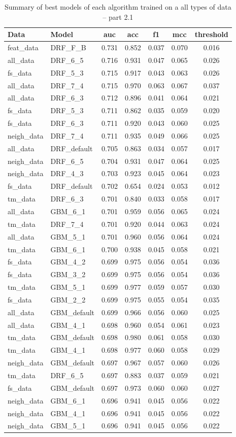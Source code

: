 \documentclass[thesis=M,english]{FITthesis}[2012/10/20]
\begin{document}
\begin{table}[H]\centering
\begin{small}
    \caption{Summary of best models of each algorithm trained on a all types of data -- part 2.1}\label{tab:all_data_summary_2_1}
    \begin{tabular}{|l|l|c|c|c|c|c|}\hline
Data & Model & \gls{auc} & \gls{acc} & \gls{f1} & \gls{mcc} & threshold \tabularnewline \hline \hline
feat\_data & DRF\_F\_B & 0.731 & 0.852 & 0.037 & 0.070 & 0.016 \tabularnewline  \hline 
all\_data & DRF\_6\_5 & 0.716 & 0.931 & 0.047 & 0.065 & 0.026 \tabularnewline  \hline 
fs\_data & DRF\_5\_3 & 0.715 & 0.917 & 0.043 & 0.063 & 0.026 \tabularnewline  \hline 
all\_data & DRF\_7\_4 & 0.715 & 0.970 & 0.063 & 0.067 & 0.037 \tabularnewline  \hline 
all\_data & DRF\_6\_3 & 0.712 & 0.896 & 0.041 & 0.064 & 0.021 \tabularnewline  \hline 
fs\_data & DRF\_5\_3 & 0.711 & 0.862 & 0.035 & 0.059 & 0.020 \tabularnewline  \hline 
fs\_data & DRF\_6\_3 & 0.711 & 0.920 & 0.043 & 0.060 & 0.025 \tabularnewline  \hline 
neigh\_data & DRF\_7\_4 & 0.711 & 0.935 & 0.049 & 0.066 & 0.025 \tabularnewline  \hline 
all\_data & DRF\_default & 0.705 & 0.863 & 0.034 & 0.057 & 0.017 \tabularnewline  \hline 
neigh\_data & DRF\_6\_5 & 0.704 & 0.931 & 0.047 & 0.064 & 0.025 \tabularnewline  \hline 
neigh\_data & DRF\_4\_3 & 0.703 & 0.923 & 0.045 & 0.064 & 0.023 \tabularnewline  \hline 
fs\_data & DRF\_default & 0.702 & 0.654 & 0.024 & 0.053 & 0.012 \tabularnewline  \hline 
tm\_data & DRF\_6\_3 & 0.701 & 0.840 & 0.033 & 0.058 & 0.017 \tabularnewline  \hline 
all\_data & GBM\_6\_1 & 0.701 & 0.959 & 0.056 & 0.065 & 0.024 \tabularnewline  \hline 
tm\_data & DRF\_7\_4 & 0.701 & 0.920 & 0.044 & 0.063 & 0.024 \tabularnewline  \hline 
all\_data & GBM\_5\_1 & 0.701 & 0.960 & 0.056 & 0.064 & 0.024 \tabularnewline  \hline 
tm\_data & GBM\_6\_1 & 0.700 & 0.938 & 0.045 & 0.058 & 0.021 \tabularnewline  \hline 
fs\_data & GBM\_4\_2 & 0.699 & 0.975 & 0.056 & 0.054 & 0.036 \tabularnewline  \hline 
fs\_data & GBM\_3\_2 & 0.699 & 0.975 & 0.056 & 0.054 & 0.036 \tabularnewline  \hline 
tm\_data & GBM\_5\_1 & 0.699 & 0.977 & 0.059 & 0.057 & 0.030 \tabularnewline  \hline 
fs\_data & GBM\_2\_2 & 0.699 & 0.975 & 0.055 & 0.054 & 0.035 \tabularnewline  \hline 
all\_data & GBM\_default & 0.699 & 0.966 & 0.056 & 0.060 & 0.025 \tabularnewline  \hline 
all\_data & GBM\_4\_1 & 0.698 & 0.960 & 0.054 & 0.061 & 0.023 \tabularnewline  \hline 
tm\_data & GBM\_default & 0.698 & 0.980 & 0.061 & 0.058 & 0.030 \tabularnewline  \hline 
tm\_data & GBM\_4\_1 & 0.698 & 0.977 & 0.060 & 0.058 & 0.029 \tabularnewline  \hline 
neigh\_data & GBM\_default & 0.697 & 0.967 & 0.057 & 0.060 & 0.026 \tabularnewline  \hline 
tm\_data & DRF\_6\_5 & 0.697 & 0.883 & 0.037 & 0.059 & 0.021 \tabularnewline  \hline 
fs\_data & GBM\_default & 0.697 & 0.973 & 0.060 & 0.060 & 0.027 \tabularnewline  \hline 
neigh\_data & GBM\_6\_1 & 0.696 & 0.941 & 0.045 & 0.056 & 0.022 \tabularnewline  \hline 
neigh\_data & GBM\_4\_1 & 0.696 & 0.941 & 0.045 & 0.056 & 0.022 \tabularnewline  \hline 
neigh\_data & GBM\_5\_1 & 0.696 & 0.941 & 0.045 & 0.056 & 0.022 \tabularnewline  \hline 
    \end{tabular}
\end{small}
\end{table}
\end{document}
